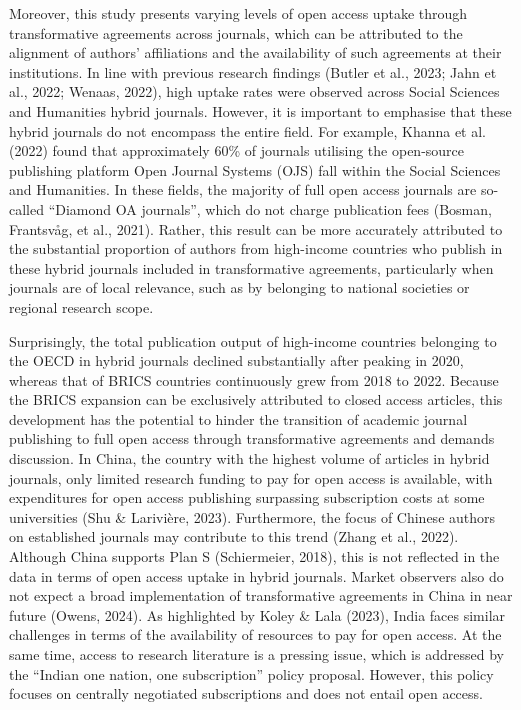\documentclass[a4paper,man,floatsintext,longtable,noextraspace,12pt]{apa6}
\begin{document}
Moreover, this study presents varying levels of open access uptake
through transformative agreements across journals, which can be
attributed to the alignment of authors' affiliations and the
availability of such agreements at their institutions. In line with
previous research findings (Butler et al., 2023; Jahn et al., 2022;
Wenaas, 2022), high uptake rates were observed across Social Sciences
and Humanities hybrid journals. However, it is important to emphasise
that these hybrid journals do not encompass the entire field. For
example, Khanna et al. (2022) found that approximately 60\% of journals
utilising the open-source publishing platform Open Journal Systems (OJS)
fall within the Social Sciences and Humanities. In these fields, the
majority of full open access journals are so-called ``Diamond OA
journals'', which do not charge publication fees (Bosman, Frantsvåg, et
al., 2021). Rather, this result can be more accurately attributed to the
substantial proportion of authors from high-income countries who publish
in these hybrid journals included in transformative agreements,
particularly when journals are of local relevance, such as by belonging
to national societies or regional research scope.

Surprisingly, the total publication output of high-income countries
belonging to the OECD in hybrid journals declined substantially after
peaking in 2020, whereas that of BRICS countries continuously grew from
2018 to 2022. Because the BRICS expansion can be exclusively attributed
to closed access articles, this development has the potential to hinder
the transition of academic journal publishing to full open access
through transformative agreements and demands discussion. In China, the
country with the highest volume of articles in hybrid journals, only
limited research funding to pay for open access is available, with
expenditures for open access publishing surpassing subscription costs at
some universities (Shu \& Larivière, 2023). Furthermore, the focus of
Chinese authors on established journals may contribute to this trend
(Zhang et al., 2022). Although China supports Plan S (Schiermeier,
2018), this is not reflected in the data in terms of open access uptake
in hybrid journals. Market observers also do not expect a broad
implementation of transformative agreements in China in near future
(Owens, 2024). As highlighted by Koley \& Lala (2023), India faces
similar challenges in terms of the availability of resources to pay for
open access. At the same time, access to research literature is a
pressing issue, which is addressed by the ``Indian one nation, one
subscription'' policy proposal. However, this policy focuses on
centrally negotiated subscriptions and does not entail open access.
\end{document}
